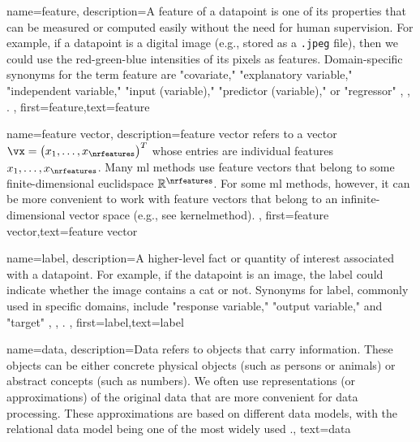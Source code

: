 {{
{name={feature},
	description={A feature of a \gls{datapoint} is one of its properties that can be 
		measured or computed easily without the need for human supervision. For example, if a \gls{datapoint} 
		is a digital image (e.g., stored as a \texttt{.jpeg} file), then we could use the red-green-blue intensities 
		of its pixels as features. Domain-specific synonyms for the term feature are "covariate," "explanatory variable," 
		"independent variable," "input (variable)," "predictor (variable)," or "regressor" \cite{Gujarati2021}, \cite{Dodge2003}, \cite{Everitt2022}. 
		}, first={feature},text={feature}  
}

{name={feature vector},
	description={\Gls{feature} vector refers to a vector $\vx = \big(x_{1},\ldots,x_{\nrfeatures}\big)^{T}$ 
	whose entries are individual \gls{feature}s $x_{1},\ldots,x_{\nrfeatures}$. Many \gls{ml} methods 
	use \gls{feature} vectors that belong to some finite-dimensional \gls{euclidspace} $\mathbb{R}^{\nrfeatures}$. 
	For some \gls{ml} methods, however, it can be more convenient to work with \gls{feature} 
	vectors that belong to an infinite-dimensional vector space (e.g., see \gls{kernelmethod}). 
		}, first={feature vector},text={feature vector}  
}


{name={label},
	description={A higher-level fact or quantity of interest associated with a \gls{datapoint}. 
		For example, if the \gls{datapoint} is an image, the label could indicate whether the 
		image contains a cat or not. Synonyms for label, commonly used in specific domains, 
		include "response variable," "output variable," and "target" \cite{Gujarati2021}, \cite{Dodge2003}, \cite{Everitt2022}.
 },
	first={label},text={label}  
}


{name={data},
	 description={Data refers to objects that carry information. These 
	 	objects can be either concrete physical objects (such as persons or animals) 
	 	or abstract concepts (such as numbers). We often use representations (or 
	 	approximations) of the original data that are more convenient for data processing. 
	 	These approximations are based on different data models, with the relational data 
	 	model being one of the most widely used \cite{codd1970relational}.}, 
	text={data}
}

}}
